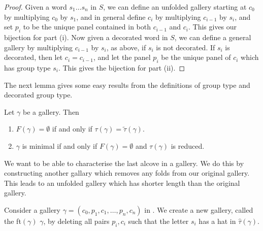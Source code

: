 \documentclass[11pt]{article}
\begin{document}
\begin{proof}
    Given a word $s_1\hdots s_n$ in $S$, we can define an unfolded gallery starting at $c_0$ by multiplying $c_0$ by $s_1$, and in general define $c_i$ by multiplying $c_{i-1}$ by $s_{i}$, and set $p_i$ to be the unique panel contained in both $c_{i-1}$ and $c_i$. This gives our bijection for part (i). 
    Now given a decorated word in $S$, we can define a general gallery by multiplying $c_{i-1}$ by $s_{i}$, as above, if $s_{i}$ is not decorated. If $s_{i}$ is decorated, then let $c_i=c_{i-1}$, and let the panel $p_i$ be the unique panel of $c_i$ which has group type $s_i$. This gives the bijection for part (ii). 
\end{proof}

The next lemma gives some easy results from the definitions of group type and decorated group type. 

\begin{lemma}\cite[p.128]{SHA}
    Let $\gamma$ be a gallery. Then
    \begin{enumerate}
        \item $F(\gamma)=\emptyset$ if and only if $\tau(\gamma)=\tilde{\tau}(\gamma).$
        \item $\gamma$ is minimal if and only if $F(\gamma)=\emptyset$ and $\tau(\gamma)$ is reduced.
    \end{enumerate}
\end{lemma}

We want to be able to characterise the last alcove in a gallery. We do this by constructing another gallary which removes any folds from our original gallery. This leads to an unfolded gallery which has shorter length than the original gallery.

\begin{definition}
    Consider a gallery $\gamma = (c_0,p_1,c_1,\hdots ,p_n,c_n)$ in \sg. We create a new gallery, called the  ft$(\gamma)$  $\gamma$, by deleting all pairs $p_i,c_i$ such that the letter $s_i$ has a hat in $\hat{\tau}(\gamma)$. 

\end{definition}
\end{document}
